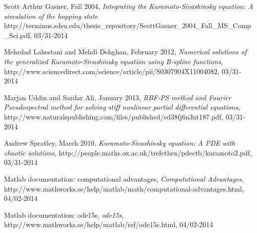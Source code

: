 \documentclass[10pt,a4paper]{article}
\begin{document}
\begin{thebibliography}{9}

Scott Arthur Gasner, Fall 2004,
\emph{Integrating the Kuramoto-Sivashinsky equation: A simulation of the hopping state}
http://terminus.sdsu.edu/thesis\_repository/ScottGasner\_2004\_Fall\_MS\_Comp\_Sci.pdf, 03/31-2014

Mehrdad Lakestani and Mehdi Dehghan, February 2012,
\emph{Numerical solutions of the generalized Kuramoto-Sivashinsky equation using B-spline functions},
http://www.sciencedirect.com/science/article/pii/S0307904X11004082, 03/31-2014

Marjan Uddin and Sardar Ali, January 2013,
\emph{RBF-PS method and Fourier Pseudospectral method for solving stiff 
nonlinear partial differential equations},
http://www.naturalspublishing.com/files/published/ed38fj6n3xt187.pdf, 03/31-2014

Andrew Spratley, March 2010,
\emph{Kuramoto-Sivashinsky equation: A PDE with chaotic solutions},
http://people.maths.ox.ac.uk/trefethen/pdectb/kuramoto2.pdf, 03/31-2014

Matlab documentation: computational advantages,
\emph{Computational Advantages},
http://www.mathworks.se/help/matlab/math/computational-advantages.html, 04/02-2014

Matlab documentation: ode15s,
\emph{ode15s},
http://www.mathworks.se/help/matlab/ref/ode15s.html, 04/02-2014


\end{thebibliography}

\end{document}
